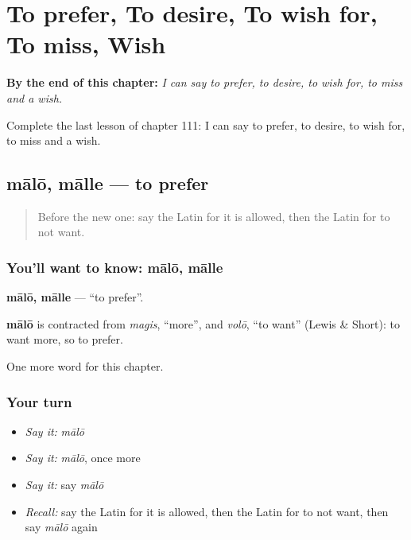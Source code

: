 
\chapter{To prefer, To desire, To wish for, To miss, Wish}
\label{ch:la-to-prefer-to-desire-to-wish-for-to-miss-wish}

\begin{chapteropening}
\textbf{By the end of this chapter:} \emph{I can say to prefer, to desire, to wish for, to miss and a wish.}

Complete the last lesson of chapter 111: I can say to prefer, to desire, to wish for, to miss and a wish.
\end{chapteropening}

\section[mālō, mālle]{mālō, mālle — to prefer}

\label{lesson:LA-C111-malo}



\begin{quote}
Before the new one: say the Latin for it is allowed, then the Latin for to not want.
\end{quote}

\subsection*{You'll want to know: mālō, mālle}
\textbf{mālō, mālle} — \textquotedblleft{}to prefer\textquotedblright{}.

\begin{cousinweb}
\textbf{mālō} is contracted from \emph{magis}, \textquotedblleft{}more\textquotedblright{}, and \emph{volō}, \textquotedblleft{}to want\textquotedblright{} (Lewis \& Short): to want more, so to prefer.
\end{cousinweb}

\begin{grammarlens}[title={What you've built}]
One more word for this chapter.
\end{grammarlens}

\subsection*{Your turn}
\begin{itemize}
\raggedright
  \item \emph{Say it:} \emph{mālō}
  \item \emph{Say it:} \emph{mālō}, once more
  \item \emph{Say it:} say \emph{mālō}
  \item \emph{Recall:} say the Latin for it is allowed, then the Latin for to not want, then say \emph{mālō} again
\end{itemize}

